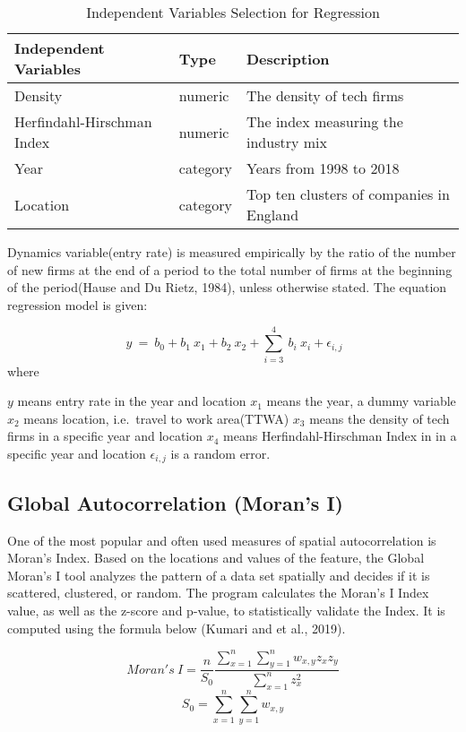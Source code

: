 \documentclass[
  12pt,
  oneside]{book}
\begin{document}
\begin{table}

\caption{\label{tab:tab-reg-idp-var}Independent Variables Selection for Regression}
\centering
\begin{tabular}[t]{lll}
\toprule
\textbf{Independent Variables} & \textbf{Type} & \textbf{Description}\\
\midrule
Density & numeric & The density of tech firms\\
Herfindahl-Hirschman Index & numeric & The index measuring the industry mix\\
Year & category & Years from 1998 to 2018\\
Location & category & Top ten clusters of companies in England\\
\bottomrule
\end{tabular}
\end{table}

Dynamics variable(entry rate) is measured empirically by the ratio of the number of new firms at the end of a period to the total number of firms at the beginning of the period(Hause and Du Rietz, 1984), unless otherwise stated. The equation regression model is given:

\[
\ y\ =\ b_0 + b_1 \ x_1 + b_2 \ x_2 + \sum_{i=3}^{4} \ b_i \ x_i + \epsilon_{i,j}
\]
where

\(y\) means entry rate in the year and location
\(x_1\) means the year, a dummy variable
\(x_2\) means location, i.e.~travel to work area(TTWA)
\(x_3\) means the density of tech firms in a specific year and location
\(x_4\) means Herfindahl-Hirschman Index in in a specific year and location
\(\epsilon_{i,j}\) is a random error.

\hypertarget{global-autocorrelation-morans-i}{%
\subsection{Global Autocorrelation (Moran's I)}\label{global-autocorrelation-morans-i}}

One of the most popular and often used measures of spatial autocorrelation is Moran's Index. Based on the locations and values of the feature, the Global Moran's I tool analyzes the pattern of a data set spatially and decides if it is scattered, clustered, or random. The program calculates the Moran's I Index value, as well as the z-score and p-value, to statistically validate the Index. It is computed using the formula below (Kumari and et al., 2019).

\[
Moran's \ I = \frac{n}{S_0} \frac{\sum_{x=1}^n \sum_{y=1}^n w_{x,y} z_x z_y}{\sum_{x=1}^n z_x^2}
\]
\[
S_0 = \sum_{x=1}^n \sum_{y=1}^n w_{x,y}
\]
\end{document}
